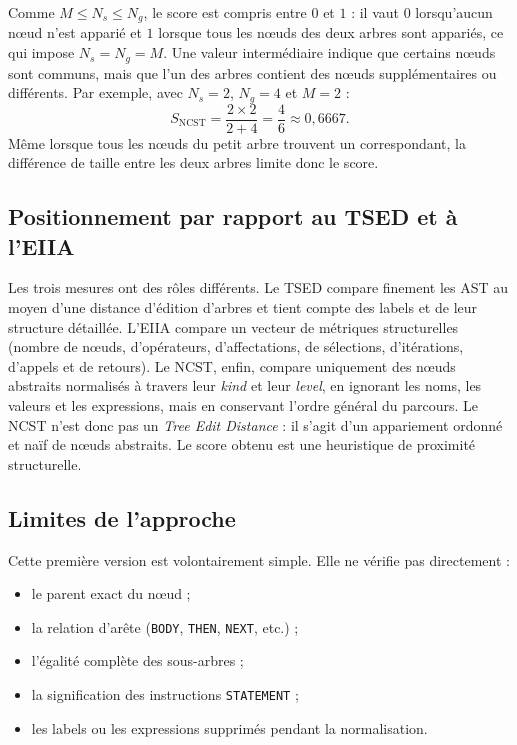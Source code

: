 \documentclass[12pt,a4paper,oneside]{report}
\begin{document}
Comme $M \leq N_s \leq N_g$, le score est compris entre $0$ et $1$ : il vaut
$0$ lorsqu'aucun nœud n'est apparié et $1$ lorsque tous les nœuds des deux
arbres sont appariés, ce qui impose $N_s = N_g = M$. Une valeur intermédiaire
indique que certains nœuds sont communs, mais que l'un des arbres contient des
nœuds supplémentaires ou différents. Par exemple, avec $N_s = 2$, $N_g = 4$ et
$M = 2$ :
\begin{equation}
S_{\mathrm{NCST}} = \frac{2\times 2}{2+4} = \frac{4}{6} \approx 0{,}6667.
\end{equation}
Même lorsque tous les nœuds du petit arbre trouvent un correspondant, la
différence de taille entre les deux arbres limite donc le score.

\subsection{Positionnement par rapport au TSED et à l'EIIA}

Les trois mesures ont des rôles différents. Le TSED compare finement les AST au
moyen d'une distance d'édition d'arbres et tient compte des labels et de leur
structure détaillée. L'EIIA compare un vecteur de métriques structurelles
(nombre de nœuds, d'opérateurs, d'affectations, de sélections, d'itérations,
d'appels et de retours). Le NCST, enfin, compare uniquement des nœuds abstraits
normalisés à travers leur \emph{kind} et leur \emph{level}, en ignorant les
noms, les valeurs et les expressions, mais en conservant l'ordre général du
parcours. Le NCST n'est donc pas un \emph{Tree Edit Distance} : il s'agit d'un
appariement ordonné et naïf de nœuds abstraits. Le score obtenu est une
heuristique de proximité structurelle.
\subsection{Limites de l'approche}

Cette première version est volontairement simple. Elle ne vérifie pas
directement :
\begin{itemize}
  \item le parent exact du nœud ;
  \item la relation d'arête (\texttt{BODY}, \texttt{THEN}, \texttt{NEXT}, etc.) ;
  \item l'égalité complète des sous-arbres ;
  \item la signification des instructions \texttt{STATEMENT} ;
  \item les labels ou les expressions supprimés pendant la normalisation.
\end{itemize}
\end{document}
